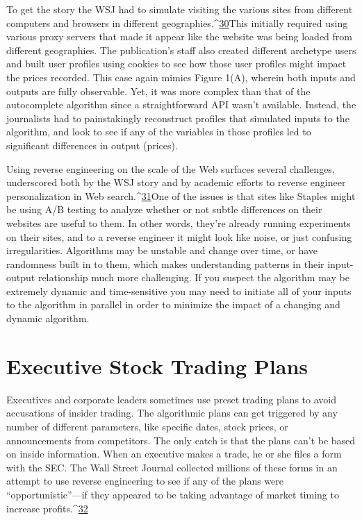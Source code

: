 To get the story the WSJ had to simulate visiting the various sites from different computers and browsers in different geographies.^{\href{#endnotes}{30}}This initially required using various proxy servers that made it appear like the website was being loaded from different geographies. The publication's staff also created different archetype users and built user profiles using cookies to see how those user profiles might impact the prices recorded. This case again mimics Figure 1(A), wherein both inputs and outputs are fully observable. Yet, it was more complex than that of the autocomplete algorithm since a straightforward API wasn't available. Instead, the journalists had to painstakingly reconstruct profiles that simulated inputs to the algorithm, and look to see if any of the variables in those profiles led to significant differences in output (prices). 

Using reverse engineering on the scale of the Web surfaces several challenges, underscored both by the WSJ story and by academic efforts to reverse engineer personalization in Web search.^{\href{#endnotes}{31}}One of the issues is that sites like Staples might be using A/B testing to analyze whether or not subtle differences on their websites are useful to them. In other words, they're already running experiments on their sites, and to a reverse engineer it might look like noise, or just confusing irregularities. Algorithms may be unstable and change over time, or have randomness built in to them, which makes understanding patterns in their input-output relationship much more challenging. If you suspect the algorithm may be extremely dynamic and time-sensitive you may need to initiate all of your inputs to the algorithm in parallel in order to minimize the impact of a changing and dynamic algorithm. 

\section{Executive Stock Trading Plans }
Executives and corporate leaders sometimes use preset trading plans to avoid accusations of insider trading. The algorithmic plans can get triggered by any number of different parameters, like specific dates, stock prices, or announcements from competitors. The only catch is that the plans can't be based on inside information. When an executive makes a trade, he or she files a form with the SEC. The Wall Street Journal collected millions of these forms in an attempt to use reverse engineering to see if any of the plans were ``opportunistic''—if they appeared to be taking advantage of market timing to increase profits.^{\href{#endnotes}{32}}


